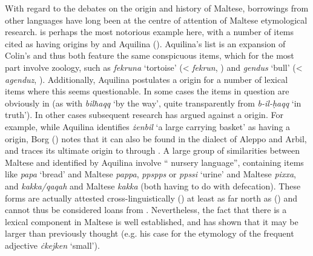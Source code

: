 \documentclass[output=paper]{langsci/langscibook}
\begin{document}

With regard to the debates on the origin and history of Maltese, borrowings from other  languages have long been at the centre of attention of Maltese etymological research.  is perhaps the most notorious example here, with a number of items cited as having  origins by \cite{colin1957} and Aquilina (\citeyear[25--39]{aquilina1976}). Aquilina's list is an expansion of Colin's and thus both feature the same conspicuous items, which for the most part involve zoology, such as \textit{fekruna} `tortoise' (< \textit{fekrun}, \citealt[553]{naitzerrad2002}) and \textit{gendus} `bull' (< \textit{agenduz}, \citealt[827]{naitzerrad2002}).
Additionally, Aquilina postulates a  origin for a number of lexical items where this seems questionable. In some cases the items in question are obviously   in  (as with \textit{bilħaqq} `by the way', quite transparently from  \textit{b-il-\d{h}aqq} `in truth'). In other cases subsequent research has argued against a  origin. For example, while Aquilina identifies \textit{żenbil} `a large carrying basket' as having a  origin, Borg (\citeyear[261]{Borg2004}) notes that it can also be found in the  dialect of Aleppo and Arbil, and traces its ultimate origin to  through . A large group of similarities between Maltese and  identified by Aquilina involve `` nursery language'', containing items like  \textit{papa} `bread' and Maltese \textit{pappa},  \textit{ppspps} or \textit{ppssi} `urine' and Maltese \textit{pixxa}, and  \textit{kakka/qaqah} and Maltese \textit{kakka} (both having to do with defecation). These forms are actually attested cross-linguistically (\citealt{ferguson1964}) at least as far north as  (\citealt{ondrackova2010}) and cannot thus be considered loans from . Nevertheless, the fact that there is a  lexical component in Maltese is well established, and \cite{Souag2018berber} has shown that it may be larger than previously thought (e.g. his case for the  etymology of the frequent adjective \textit{ċkejken} `small').
\end{document}
